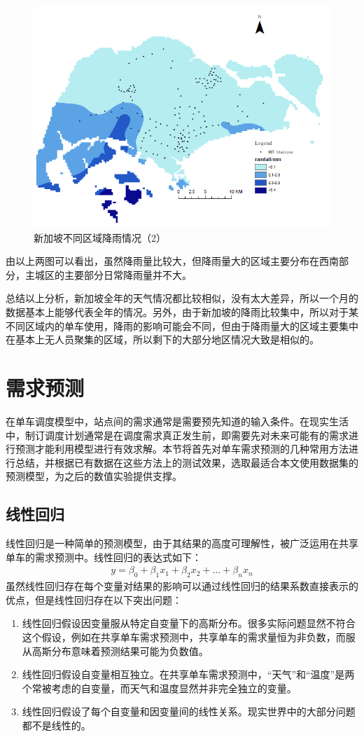 \documentclass[]{tongjithesis}
\numberwithin{equation}{chapter}
\begin{document}
\begin{figure}[H]
	\centering
	\includegraphics[width= 0.75 \textwidth]{figures_main/kriging1.png}
	\caption{新加坡不同区域降雨情况（2）}
	\label{kriging1}
\end{figure}

由以上两图可以看出，虽然降雨量比较大，但降雨量大的区域主要分布在西南部分，主城区的主要部分日常降雨量并不大。

总结以上分析，新加坡全年的天气情况都比较相似，没有太大差异，所以一个月的数据基本上能够代表全年的情况。另外，由于新加坡的降雨比较集中，所以对于某不同区域内的单车使用，降雨的影响可能会不同，但由于降雨量大的区域主要集中在基本上无人员聚集的区域，所以剩下的大部分地区情况大致是相似的。
\clearpage

\chapter{需求预测}
在单车调度模型中，站点间的需求通常是需要预先知道的输入条件。在现实生活中，制订调度计划通常是在调度需求真正发生前，即需要先对未来可能有的需求进行预测才能利用模型进行有效求解。本节将首先对单车需求预测的几种常用方法进行总结，并根据已有数据在这些方法上的测试效果，选取最适合本文使用数据集的预测模型，为之后的数值实验提供支撑。
\section{线性回归}
线性回归是一种简单的预测模型，由于其结果的高度可理解性，被广泛运用在共享单车的需求预测中。线性回归的表达式如下：
\begin{align}
	y = \beta_{0}+\beta_{1}x_{1}+\beta_{2}x_{2}+...+\beta_{n}x_{n}
\end{align}
\noindent
虽然线性回归存在每个变量对结果的影响可以通过线性回归的结果系数直接表示的优点，但是线性回归存在以下突出问题：
\begin{enumerate}
	\item 线性回归假设因变量服从特定自变量下的高斯分布。很多实际问题显然不符合这个假设，例如在共享单车需求预测中，共享单车的需求量恒为非负数，而服从高斯分布意味着预测结果可能为负数值。
	\item 线性回归假设自变量相互独立。在共享单车需求预测中，“天气”和“温度”是两个常被考虑的自变量，而天气和温度显然并非完全独立的变量。
	\item 线性回归假设了每个自变量和因变量间的线性关系。现实世界中的大部分问题都不是线性的。
\end{enumerate}
\end{document}
